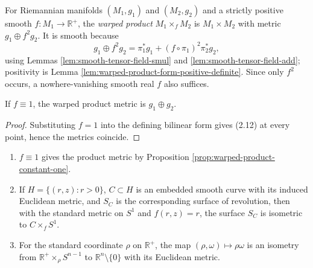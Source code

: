 \begin{definition}
\label{def:warped-product}
\leanok
{}
For Riemannian manifolds $(M_1,g_1)$ and $(M_2,g_2)$ and a strictly positive smooth $f:M_1\to\mathbb R^+$, the \emph{warped product} $M_1\times_fM_2$ is $M_1\times M_2$ with metric $g_1\oplus f^2g_2$. It is smooth because
\[
g_1\oplus f^2g_2=\pi_1^*g_1+(f\circ\pi_1)^2\pi_2^*g_2,
\]
using Lemmas \ref{lem:smooth-tensor-field-smul} and \ref{lem:smooth-tensor-field-add}; positivity is Lemma \ref{lem:warped-product-form-positive-definite}. Since only $f^2$ occurs, a nowhere-vanishing smooth real $f$ also suffices.
\end{definition}

\begin{proposition}
\label{prop:warped-product-constant-one}
\leanok
{}
If $f\equiv1$, the warped product metric is $g_1\oplus g_2$.
\end{proposition}

\begin{proof}
\leanok
{}
\sketch Substituting $f=1$ into the defining bilinear form gives (2.12) at every point, hence the metrics coincide.
\end{proof}

\begin{example}
\label{ex:warped-products}
\begin{enumerate}
\item[(a)] $f\equiv1$ gives the product metric by Proposition \ref{prop:warped-product-constant-one}.
\item[(b)] If $H=\{(r,z):r>0\}$, $C\subset H$ is an embedded smooth curve
with its induced Euclidean metric, and $S_C$ is the corresponding surface of
revolution, then with the standard metric on $S^1$ and $f(r,z)=r$, the surface
$S_C$ is isometric to $C\times_fS^1$.
\item[(c)] For the standard coordinate $\rho$ on $\mathbb R^+$, the map
$(\rho,\omega)\mapsto\rho\omega$ is an isometry from
$\mathbb R^+\times_\rho S^{n-1}$ to $\mathbb R^n\setminus\{0\}$ with its
Euclidean metric.
\end{enumerate}
\end{example}

